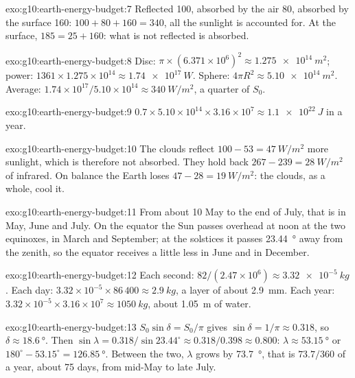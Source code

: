 \begin{solution}{exo:g10:earth-energy-budget:7}
Reflected 100, absorbed by the air 80, absorbed by the surface 160:
$100 + 80 + 160 = 340$, all the sunlight is accounted for. At the surface,
$185 = 25 + 160$: what is not reflected is absorbed.
\end{solution}

\begin{solution}{exo:g10:earth-energy-budget:8}
Disc: $\pi \times (6.371\times10^6)^2 \approx \qty{1.275e14}{m^2}$; power:
$1361 \times 1.275\times10^{14} \approx \qty{1.74e17}{W}$. Sphere: $4\pi
R^2 \approx \qty{5.10e14}{m^2}$. Average: $1.74\times10^{17}/5.10\times
10^{14} \approx \qty{340}{W/m^2}$, a quarter of $S_0$.
\end{solution}

\begin{solution}{exo:g10:earth-energy-budget:9}
$0.7 \times 5.10\times10^{14} \times 3.16\times10^7 \approx
\qty{1.1e22}{J}$ in a year.
\end{solution}

\begin{solution}{exo:g10:earth-energy-budget:10}
The clouds reflect $100 - 53 = \qty{47}{W/m^2}$ more sunlight, which is
therefore not absorbed. They hold back $267 - 239 = \qty{28}{W/m^2}$ of
infrared. On balance the Earth loses $47 - 28 = \qty{19}{W/m^2}$: the clouds,
as a whole, cool it.
\end{solution}

\begin{solution}{exo:g10:earth-energy-budget:11}
From about 10 May to the end of July, that is in May, June and July. On the
equator the Sun passes overhead at noon at the two equinoxes, in March and
September; at the solstices it passes \qty{23.44}{\degree} away from the
zenith, so the equator receives a little less in June and in December.
\end{solution}

\begin{solution}{exo:g10:earth-energy-budget:12}
Each second: $82/(2.47\times10^6) \approx \qty{3.32e-5}{kg}$. Each day:
$3.32\times10^{-5} \times 86\,400 \approx \qty{2.9}{kg}$, a layer of about
\qty{2.9}{mm}. Each year: $3.32\times10^{-5} \times 3.16\times10^7 \approx
\qty{1050}{kg}$, about \qty{1.05}{m} of water.
\end{solution}

\begin{solution}{exo:g10:earth-energy-budget:13}
$S_0 \sin\delta = S_0/\pi$ gives $\sin\delta = 1/\pi \approx 0.318$, so
$\delta \approx \qty{18.6}{\degree}$. Then $\sin\lambda = 0.318/\sin 23.44^\circ
\approx 0.318/0.398 \approx 0.800$: $\lambda \approx \qty{53.15}{\degree}$ or
$180^\circ - 53.15^\circ = \qty{126.85}{\degree}$. Between the two, $\lambda$
grows by \qty{73.7}{\degree}, that is $73.7/360$ of a year, about
\num{75} days, from mid-May to late July.
\end{solution}

